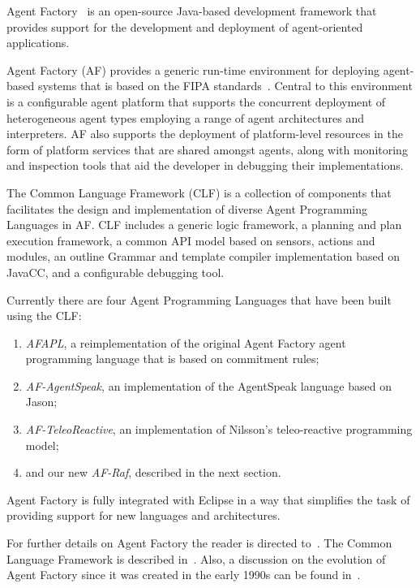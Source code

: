 \documentclass{aamas2012} %
\theoremstyle{remark}
\begin{document}
Agent Factory~\cite{collier2002agent} is an open-source Java-based
development framework that provides support for the development and
deployment of agent-oriented applications.

Agent Factory (AF) provides a generic run-time environment for deploying
agent-based systems that is based on the FIPA standards~\cite{poslad2000fipa}.
Central to this environment is a configurable agent platform that supports the
concurrent deployment of heterogeneous agent types employing a range of agent
architectures and interpreters. AF also supports the deployment of
platform-level resources in the form of platform services that are shared
amongst agents, along with monitoring and inspection tools that aid the
developer in debugging their implementations. 

The Common Language Framework (CLF) is a collection of components that
facilitates the design and implementation of diverse Agent Programming
Languages in AF. CLF includes a generic logic framework, a planning and
plan execution framework, a common API model based on sensors, actions and
modules, an outline Grammar and template compiler implementation based on
JavaCC, and a configurable debugging tool.

Currently there are four Agent Programming Languages that have been built
using the CLF: 
\begin{enumerate}

\item \textit{AFAPL}, a reimplementation of the original Agent Factory
agent programming language that is based on commitment rules;

\item \textit{AF-AgentSpeak}, an implementation of the AgentSpeak language based on Jason;

\item \textit{AF-TeleoReactive}, an implementation of Nilsson's teleo-reactive
programming model; 

\item and our new \textit{AF-Raf}, described in the next section.
\end{enumerate}

Agent Factory is fully integrated with Eclipse in a way that simplifies
the task of providing support for new languages and architectures.

For further details on Agent Factory the reader is directed
to~\cite{collier2009modeling}. The Common Language Framework is described
in~\cite{russell2011af}. Also, a discussion on the evolution of Agent Factory since it
was created in the early 1990s can be found in~\cite{muldoon2009towards}.
\end{document}
